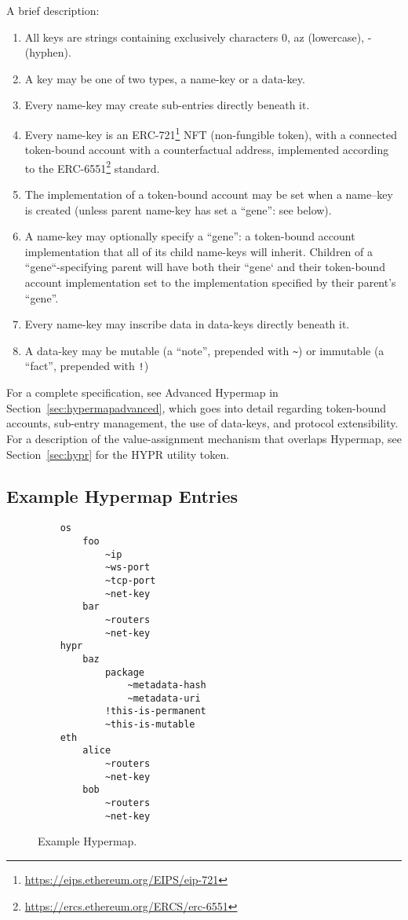 \documentclass[runningheads]{llncs}
\begin{document}
A brief description:

\begin{enumerate}
    \item All keys are strings containing exclusively characters 0, a\textendash z (lowercase),    - (hyphen).
    \item A key may be one of two types, a name-key or a data-key.
    \item Every name-key may create sub-entries directly beneath it.
    \item Every name-key is an ERC-721\footnote{\url{https://eips.ethereum.org/EIPS/eip-721}} NFT (non-fungible token), with a connected token-bound account with a counterfactual address, implemented according to the ERC-6551\footnote{\url{https://ercs.ethereum.org/ERCS/erc-6551}} standard.
    \item The implementation of a token-bound account may be set when a name–key is created (unless parent name-key has set a ``gene'': see below).
    \item A name-key may optionally specify a ``gene'': a token-bound account implementation that all of its child name-keys will inherit.
    		  Children of a ``gene``-specifying parent will have both their ``gene` and their token-bound account implementation set to the implementation specified by their parent's ``gene''.
    \item Every name-key may inscribe data in data-keys directly beneath it.
    \item A data-key may be mutable (a ``note'', prepended with \verb|~|) or immutable (a ``fact'', prepended with \verb|!|)
\end{enumerate}

For a complete specification, see Advanced Hypermap in Section~\ref{sec:hypermapadvanced}, which goes into detail regarding token-bound accounts, sub-entry management, the use of data-keys, and protocol extensibility.
For a description of the value-assignment mechanism that overlaps Hypermap, see Section~\ref{sec:hypr} for the HYPR utility token.

\subsection{Example Hypermap Entries}

\begin{figure}[H]
    \centering
    \begin{verbatim}
    os
        foo
            ~ip
            ~ws-port
            ~tcp-port
            ~net-key
        bar
            ~routers
            ~net-key
    hypr
        baz
            package
                ~metadata-hash
                ~metadata-uri
            !this-is-permanent
            ~this-is-mutable
    eth
        alice
            ~routers
            ~net-key
        bob
            ~routers
            ~net-key
    \end{verbatim}
    \caption{Example Hypermap.}
    \label{fig:example hypermap}
\end{figure}
\end{document}
